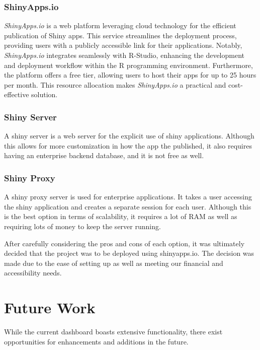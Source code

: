 \documentclass{sigchi}
\begin{document}
\subsubsection{ShinyApps.io}
\emph{ShinyApps.io} is a web platform leveraging cloud technology for the efficient publication of Shiny apps. This service streamlines the deployment process, providing users with a publicly accessible link for their applications. Notably, \emph{ShinyApps.io} integrates seamlessly with R-Studio, enhancing the development and deployment workflow within the R programming environment. Furthermore, the platform offers a free tier, allowing users to host their apps for up to 25 hours per month. This resource allocation makes \emph{ShinyApps.io} a practical and cost-effective solution.\cite{3_App_Distribution}
\subsubsection{Shiny Server} A shiny server is a web server for the explicit use of shiny applications. Although this allows for more customization in how the app the published, it also requires having an enterprise backend database, and it is not free as well.\cite{3_App_Distribution}
\subsubsection{Shiny Proxy}
A shiny proxy server is used for enterprise applications. It takes a user accessing the shiny application and creates a separate session for each user. Although this is the best option in terms of scalability, it requires a lot of RAM as well as requiring lots of money to keep the server running.\cite{3_App_Distribution}

 After carefully considering the pros and cons of each option, it was ultimately decided that the project was to be deployed using shinyapps.io. The decision was made due to the ease of setting up as well as meeting our financial and accessibility needs.

\section{Future Work}
While the current dashboard boasts extensive functionality, there exist opportunities for enhancements and additions in the future.
\end{document}
